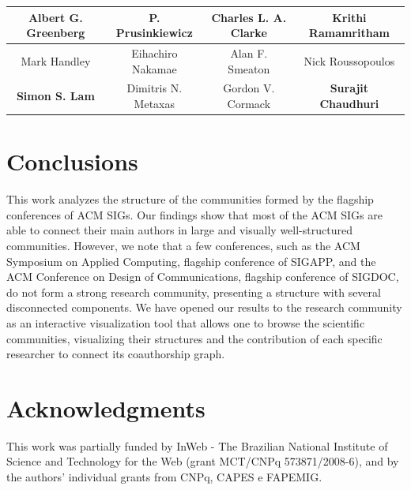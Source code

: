 \documentclass{sig-alternate-10pt}
\begin{document}
\begin{table}[t]
\begin{scriptsize}
\begin{tabular}{|c|c|c|c|}
Albert G. Greenberg & \textbf{P. Prusinkiewicz} & Charles L. A. Clarke & Krithi Ramamritham\\ \hline
Mark Handley & Eihachiro Nakamae & Alan F. Smeaton & Nick Roussopoulos\\ \hline
\textbf{Simon S. Lam} & Dimitris N. Metaxas & Gordon V. Cormack & \textbf{Surajit Chaudhuri}\\ \hline
\end{tabular}
\label{tab:authors_frequency_core_community2}
\end{scriptsize}
\end{table}



\section{Conclusions}

This work analyzes the structure of the communities formed by the flagship conferences of ACM SIGs. Our findings show that most of the ACM SIGs are able to connect their main authors in large and visually well-structured communities. However, we note that a few conferences, such as the ACM Symposium on Applied Computing, flagship conference of SIGAPP, and the ACM Conference on Design of Communications, flagship conference of SIGDOC, do not form a strong research community, presenting a structure with several disconnected components. We have opened our results to the research community as an interactive visualization tool that allows one to browse the scientific communities, visualizing their structures and the contribution of each specific researcher to connect its coauthorship graph.


\section*{Acknowledgments}

This work was partially funded by InWeb - The Brazilian National Institute
of Science and Technology for the Web (grant MCT/CNPq 573871/2008-6), and
by the authors' individual grants from CNPq, CAPES e FAPEMIG.




\end{document}
